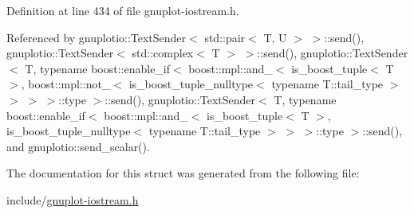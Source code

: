 Definition at line 434 of file gnuplot-\/iostream.\+h.



Referenced by gnuplotio\+::\+Text\+Sender$<$ std\+::pair$<$ T, U $>$ $>$\+::send(), gnuplotio\+::\+Text\+Sender$<$ std\+::complex$<$ T $>$ $>$\+::send(), gnuplotio\+::\+Text\+Sender$<$ T, typename boost\+::enable\+\_\+if$<$ boost\+::mpl\+::and\+\_\+$<$ is\+\_\+boost\+\_\+tuple$<$ T $>$, boost\+::mpl\+::not\+\_\+$<$ is\+\_\+boost\+\_\+tuple\+\_\+nulltype$<$ typename T\+::tail\+\_\+type $>$ $>$ $>$ $>$\+::type $>$\+::send(), gnuplotio\+::\+Text\+Sender$<$ T, typename boost\+::enable\+\_\+if$<$ boost\+::mpl\+::and\+\_\+$<$ is\+\_\+boost\+\_\+tuple$<$ T $>$, is\+\_\+boost\+\_\+tuple\+\_\+nulltype$<$ typename T\+::tail\+\_\+type $>$ $>$ $>$\+::type $>$\+::send(), and gnuplotio\+::send\+\_\+scalar().



The documentation for this struct was generated from the following file\+:\begin{DoxyCompactItemize}
\item 
include/\hyperlink{gnuplot-iostream_8h}{gnuplot-\/iostream.\+h}\end{DoxyCompactItemize}
